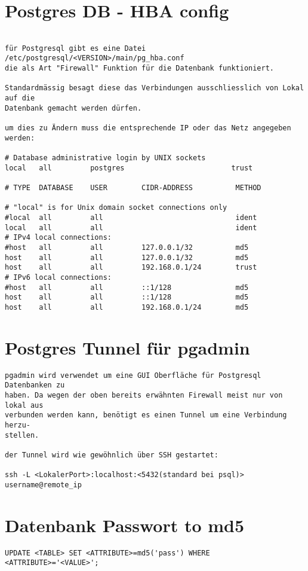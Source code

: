 \documentclass[a4paper,10pt]{report}
\begin{document}
\section{Postgres DB - HBA config}
\begin{verbatim}

für Postgresql gibt es eine Datei /etc/postgresql/<VERSION>/main/pg_hba.conf
die als Art "Firewall" Funktion für die Datenbank funktioniert.

Standardmässig besagt diese das Verbindungen ausschliesslich von Lokal auf die
Datenbank gemacht werden dürfen.

um dies zu Ändern muss die entsprechende IP oder das Netz angegeben werden:

# Database administrative login by UNIX sockets
local   all         postgres                         trust

# TYPE  DATABASE    USER        CIDR-ADDRESS          METHOD

# "local" is for Unix domain socket connections only
#local  all         all                               ident
local   all         all                               ident
# IPv4 local connections:
#host   all         all         127.0.0.1/32          md5
host    all         all         127.0.0.1/32          md5
host    all         all         192.168.0.1/24        trust
# IPv6 local connections:
#host   all         all         ::1/128               md5
host    all         all         ::1/128               md5
host    all         all         192.168.0.1/24        md5

\end{verbatim}
\pagebreak
\section{Postgres Tunnel für pgadmin}
\begin{verbatim}
pgadmin wird verwendet um eine GUI Oberfläche für Postgresql Datenbanken zu 
haben. Da wegen der oben bereits erwähnten Firewall meist nur von lokal aus 
verbunden werden kann, benötigt es einen Tunnel um eine Verbindung herzu-
stellen.

der Tunnel wird wie gewöhnlich über SSH gestartet:

ssh -L <LokalerPort>:localhost:<5432(standard bei psql)> username@remote_ip 
\end{verbatim}

\section{Datenbank Passwort to md5}
\begin{verbatim}
UPDATE <TABLE> SET <ATTRIBUTE>=md5('pass') WHERE <ATTRIBUTE>='<VALUE>';
\end{verbatim}
\end{document}

